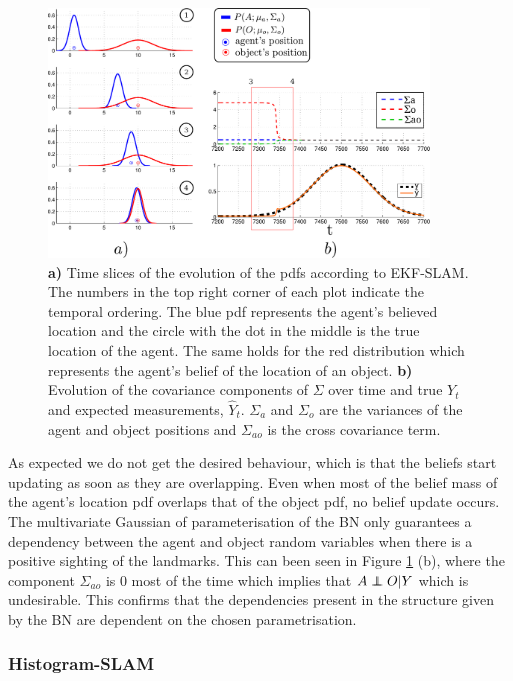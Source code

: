 \begin{figure}
\centering
 \includegraphics[width=0.9\textwidth]{./ch5-MLMF/Figures/Figure34.pdf}
\caption{\textbf{a)} Time slices of the evolution of the pdfs according to EKF-SLAM. The numbers in the top right corner of each plot indicate the 
temporal ordering.
The blue pdf represents the agent's believed location and the circle with the dot in the middle is the true location of the agent. The same holds 
for the red distribution which represents the agent's belief of the location of an object.
\textbf{b)} Evolution of the covariance components of $\Sigma$ over time and true $Y_t$ and expected measurements,  $\hat{Y}_t$. 
$\Sigma_a$ and $\Sigma_o$ are the variances of the agent and object positions and $\Sigma_{ao}$ is the cross covariance 
term.}
\label{fig:EKF-SLAM}
\end{figure}

As expected we do not get the desired behaviour, which is that the beliefs start updating as soon as they are overlapping. 
Even when most of the belief mass of the agent's location pdf overlaps that of the object pdf, no belief update occurs. 
The multivariate Gaussian of parameterisation of the BN only guarantees a dependency between the agent and object random variables 
when there is a positive sighting of the landmarks.  This can been seen in Figure \ref{fig:EKF-SLAM} (b),
where the component $\Sigma_{ao}$ is 0 most of the time which implies that $A \independent O | Y$ which is undesirable. 
This confirms that the dependencies present in the structure given by the BN are dependent on the chosen parametrisation.

\subsubsection{Histogram-SLAM}\label{sec:Discrete}

